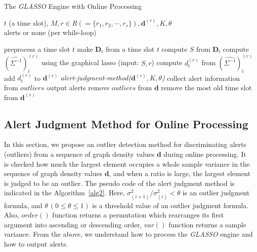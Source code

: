 \documentclass[conference]{IEEEtran}
\begin{document}
\begin{algorithm}[tb]
\caption{The {\it GLASSO} Engine with Online Processing}
\label{alg1}
\begin{algorithmic}[1]
  \REQUIRE $t$ (a time slot), $M, r \in R ( = \{r_1, r_2, \cdots, r_s\} ), \bm{d}^{(r)}, K, \theta$\\
  \ENSURE alerts or none (per while-loop)

    \STATE preprocess a time slot $t$
    \STATE make $\bm{D}_t$ from a time slot $t$
    \STATE compute $S$ from $\bm{D}_t$
      \STATE compute ${(\hat{\Sigma^{-1}})}_t^{(r)}$ using the graphical lasso (input: $S,r$)
      \STATE compute $d_t^{(r)}$ from ${(\hat{\Sigma^{-1}})}_t^{(r)}$
      \STATE add $d_t^{(r)}$ to $\bm{d}^{(r)}$
         {\it alert-judgment-method($\bm{d}^{(r)}, K, \theta$)}
          \STATE collect alert information from $outliers$
          \STATE output alerts
          \STATE remove $outliers$ from $\bm{d}$
        \ELSE
          \STATE remove the most old time slot from $\bm{d}^{(r)}$
        \ENDIF
  		\ENDIF
  	\ENDFOR
  \ENDWHILE
\end{algorithmic}
\end{algorithm}





\subsection{Alert Judgment Method for Online Processing}
In this section, we propose an outlier detection method for discriminating alerts (outliers) from a sequence of graph density values $\bm{d}$ during online processing.
It is checked how much the largest element occupies a whole sample variance in the sequence of graph density values $\bm{d}$, and when a ratio is large, the largest element is judged to be an outlier.
The pseudo code of the alert judgment method is indicated in the Algorithm~\ref{alg2}.
Here, $\sigma^{2}_{(i+1)}/\sigma^{2}_{(i)}<\theta$ is an outlier judgment formula, and $\theta \, (0\leq \theta \leq 1)$ is a threshold value of an outlier judgment formula.
Also, $order()$ function returns a permutation which rearranges its first argument into ascending or descending order, $var()$ function returns a sample variance.
From the above, we understand how to process the {\it GLASSO} engine and how to output alerts.
\end{document}
